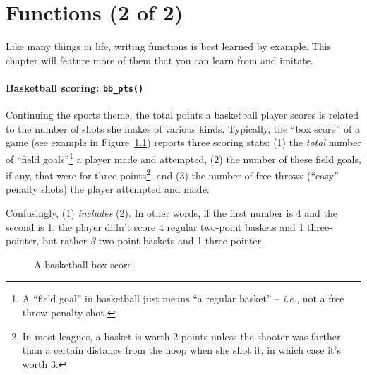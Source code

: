
\chapter{Functions (2 of 2)}

Like many things in life, writing functions is best learned by example. This
chapter will feature more of them that you can learn from and imitate.

\subsubsection{Basketball scoring: \texttt{bb\_pts()}}

Continuing the sports theme, the total points a basketball player scores is
related to the number of shots she makes of various kinds. Typically, the ``box
score'' of a game (see example in Figure~\ref{boxScore}) reports three scoring
stats: (1) the \textit{total} number of ``field goals''\footnote{A ``field
goal'' in basketball just means ``a regular basket'' -- \textit{i.e.}, not a
free throw penalty shot.} a player made and attempted, (2) the number of these
field goals, if any, that were for three points\footnote{In most leagues, a
basket is worth 2 points unless the shooter was farther than a certain distance
from the hoop when she shot it, in which case it's worth 3.}, and (3) the
number of free throws (``easy'' penalty shots) the player attempted and made.

Confusingly, (1) \textit{includes} (2). In other words, if the first number is
4 and the second is 1, the player didn't score 4 regular two-point baskets and
1 three-pointer, but rather \textit{3} two-point baskets and 1 three-pointer.

\begin{figure}[ht]
\centering
{}
\medskip
\caption{A basketball box score.}
\label{boxScore}
\end{figure}

